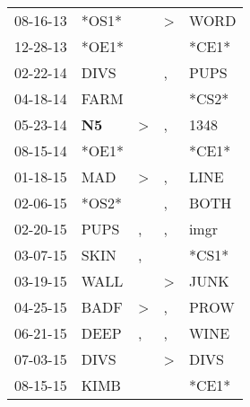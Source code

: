 \begin{supertabular}{p{0.07\textwidth}p{0.06\textwidth}p{0.02\textwidth}p{0.02\textwidth}p{0.06\textwidth}}
          08-16-13\textsuperscript{} &                            *OS1* &                  &  \textgreater &           WORD\textsuperscript{} \\
          12-28-13\textsuperscript{} &                            *OE1* &                  &               &                            *CE1* \\
          02-22-14\textsuperscript{} &           DIVS\textsuperscript{} &                  &             , &           PUPS\textsuperscript{} \\
          04-18-14\textsuperscript{} &           FARM\textsuperscript{} &                  &               &                            *CS2* \\
          05-23-14\textsuperscript{} &    \textbf{N5\textsuperscript{}} &     \textgreater &             , &           1348\textsuperscript{} \\
          08-15-14\textsuperscript{} &                            *OE1* &                  &               &                            *CE1* \\
          01-18-15\textsuperscript{} &            MAD\textsuperscript{} &     \textgreater &             , &           LINE\textsuperscript{} \\
          02-06-15\textsuperscript{} &                            *OS2* &                  &             , &           BOTH\textsuperscript{} \\
          02-20-15\textsuperscript{} &           PUPS\textsuperscript{} &                , &             , &           imgr\textsuperscript{} \\
          03-07-15\textsuperscript{} &           SKIN\textsuperscript{} &                , &               &                            *CS1* \\
          03-19-15\textsuperscript{} &           WALL\textsuperscript{} &                  &  \textgreater &           JUNK\textsuperscript{} \\
          04-25-15\textsuperscript{} &           BADF\textsuperscript{} &     \textgreater &             , &           PROW\textsuperscript{} \\
          06-21-15\textsuperscript{} &           DEEP\textsuperscript{} &                , &             , &           WINE\textsuperscript{} \\
          07-03-15\textsuperscript{} &           DIVS\textsuperscript{} &                  &  \textgreater &           DIVS\textsuperscript{} \\
          08-15-15\textsuperscript{} &           KIMB\textsuperscript{} &                  &               &                            *CE1* \\

\end{supertabular}
